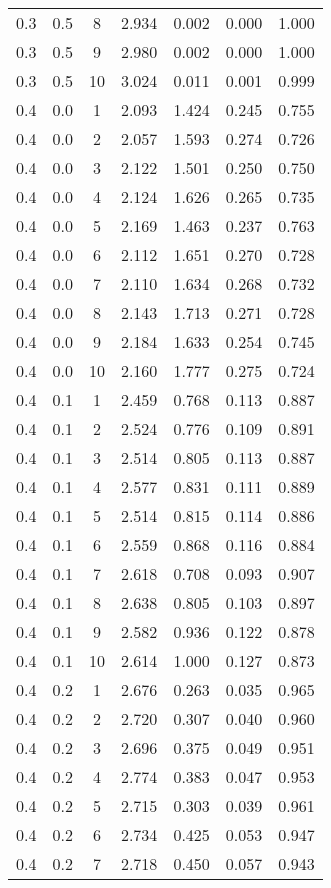 \begin{tabular}{|c|c|c|c|c|c|c|}
0.3 & 0.5 & 8 & 2.934 & 0.002 & 0.000 & 1.000 \\
0.3 & 0.5 & 9 & 2.980 & 0.002 & 0.000 & 1.000 \\
0.3 & 0.5 & 10 & 3.024 & 0.011 & 0.001 & 0.999 \\
0.4 & 0.0 & 1 & 2.093 & 1.424 & 0.245 & 0.755 \\
0.4 & 0.0 & 2 & 2.057 & 1.593 & 0.274 & 0.726 \\
0.4 & 0.0 & 3 & 2.122 & 1.501 & 0.250 & 0.750 \\
0.4 & 0.0 & 4 & 2.124 & 1.626 & 0.265 & 0.735 \\
0.4 & 0.0 & 5 & 2.169 & 1.463 & 0.237 & 0.763 \\
0.4 & 0.0 & 6 & 2.112 & 1.651 & 0.270 & 0.728 \\
0.4 & 0.0 & 7 & 2.110 & 1.634 & 0.268 & 0.732 \\
0.4 & 0.0 & 8 & 2.143 & 1.713 & 0.271 & 0.728 \\
0.4 & 0.0 & 9 & 2.184 & 1.633 & 0.254 & 0.745 \\
0.4 & 0.0 & 10 & 2.160 & 1.777 & 0.275 & 0.724 \\
0.4 & 0.1 & 1 & 2.459 & 0.768 & 0.113 & 0.887 \\
0.4 & 0.1 & 2 & 2.524 & 0.776 & 0.109 & 0.891 \\
0.4 & 0.1 & 3 & 2.514 & 0.805 & 0.113 & 0.887 \\
0.4 & 0.1 & 4 & 2.577 & 0.831 & 0.111 & 0.889 \\
0.4 & 0.1 & 5 & 2.514 & 0.815 & 0.114 & 0.886 \\
0.4 & 0.1 & 6 & 2.559 & 0.868 & 0.116 & 0.884 \\
0.4 & 0.1 & 7 & 2.618 & 0.708 & 0.093 & 0.907 \\
0.4 & 0.1 & 8 & 2.638 & 0.805 & 0.103 & 0.897 \\
0.4 & 0.1 & 9 & 2.582 & 0.936 & 0.122 & 0.878 \\
0.4 & 0.1 & 10 & 2.614 & 1.000 & 0.127 & 0.873 \\
0.4 & 0.2 & 1 & 2.676 & 0.263 & 0.035 & 0.965 \\
0.4 & 0.2 & 2 & 2.720 & 0.307 & 0.040 & 0.960 \\
0.4 & 0.2 & 3 & 2.696 & 0.375 & 0.049 & 0.951 \\
0.4 & 0.2 & 4 & 2.774 & 0.383 & 0.047 & 0.953 \\
0.4 & 0.2 & 5 & 2.715 & 0.303 & 0.039 & 0.961 \\
0.4 & 0.2 & 6 & 2.734 & 0.425 & 0.053 & 0.947 \\
0.4 & 0.2 & 7 & 2.718 & 0.450 & 0.057 & 0.943 \\

\end{tabular}
